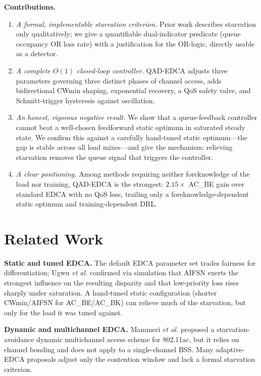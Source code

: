 \documentclass[conference]{IEEEtran}
\newcommand{\AC}[1]{AC\_#1}
\begin{document}
\textbf{Contributions.}
\begin{enumerate}
\item \emph{A formal, implementable starvation criterion.} Prior work
describes starvation only qualitatively; we give a quantifiable dual-indicator
predicate (queue occupancy OR loss rate) with a justification for the
OR-logic, directly usable as a detector.
\item \emph{A complete $O(1)$ closed-loop controller.} QAD-EDCA adjusts three
parameters governing three distinct phases of channel access, adds
bidirectional CWmin shaping, exponential recovery, a QoS safety valve, and
Schmitt-trigger hysteresis against oscillation.
\item \emph{An honest, rigorous negative result.} We show that a
queue-feedback controller cannot beat a well-chosen feedforward static optimum
in saturated steady state. We confirm this against a carefully hand-tuned
static optimum---the gap is stable across all load mixes---and give the
mechanism: relieving starvation removes the queue signal that triggers the
controller.
\item \emph{A clear positioning.} Among methods requiring neither foreknowledge
of the load nor training, QAD-EDCA is the strongest: $2.15\times$ \AC{BE} gain
over standard EDCA with no QoS loss, trailing only a foreknowledge-dependent
static optimum and training-dependent DRL.
\end{enumerate}

\section{Related Work}\label{sec:related}
\textbf{Static and tuned EDCA.} The default EDCA parameter set
\cite{ieee80211} trades fairness for differentiation; Ugwu \emph{et al.}
\cite{ugwu} confirmed via simulation that AIFSN exerts the strongest influence
on the resulting disparity and that low-priority loss rises sharply under
saturation. A hand-tuned static configuration (shorter CWmin/AIFSN for
\AC{BE}/\AC{BK}) can relieve much of the starvation, but only for the load it
was tuned against.

\textbf{Dynamic and multichannel EDCA.} Mammeri \emph{et al.} \cite{mammeri}
proposed a starvation-avoidance dynamic multichannel access scheme for
802.11ac, but it relies on channel bonding and does not apply to a
single-channel BSS. Many adaptive-EDCA proposals adjust only the contention
window and lack a formal starvation criterion.
\end{document}
